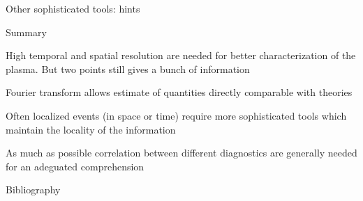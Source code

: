 \documentclass[t,10pt]{beamer}
\begin{document}
\begin{frame}{Other sophisticated tools: hints}


\end{frame}

\begin{frame}{Summary}
\begin{itemize}
{\large\item High temporal and spatial resolution are needed for better
  characterization of the plasma. But two points still gives a bunch
  of information
\item Fourier transform allows estimate of quantities directly
  comparable with theories
\item Often localized events (in space or time) require more
  sophisticated tools which maintain the locality of the information
\item As much as possible correlation between different diagnostics
  are generally needed for an adeguated comprehension}
\end{itemize}

\end{frame}
\begin{frame}[allowframebreaks]{Bibliography}
\printbibliography
\end{frame}
\end{document}
